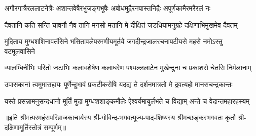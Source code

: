 \begin{AutoCols}[\maxColumns]
\fourlineindentedshloka
{अगौरगात्रैरललाटनेत्रैः}
{अशान्तवेषैरभुजङ्गभूषैः}
{अबोधमुद्रैरनपास्तनिद्रैः}
{अपूर्णकामैरमरैरलं नः}

\fourlineindentedshloka
{दैवतानि कति सन्ति चावनौ}
{नैव तानि मनसो मतानि मे}
{दीक्षितं जडधियामनुग्रहे}
{दक्षिणाभिमुखमेव दैवतम्}

\fourlineindentedshloka
{मुदिताय मुग्धशशिनावतंसिने}
{भसितावलेपरमणीयमूर्तये}
{जगदीन्द्रजालरचनापटीयसे}
{महसे नमोऽस्तु वटमूलवासिने}

\fourlineindentedshloka
{व्यालम्बिनीभिः परितो जटाभिः}
{कलावशेषेण कलाधरेण}
{पश्यल्ललाटेन मुखेन्दुना च}
{प्रकाशसे चेतसि निर्मलानाम्}

\fourlineindentedshloka
{उपासकानां त्वमुमासहायः}
{पूर्णेन्दुभावं प्रकटीकरोषि}
{यदद्य ते दर्शनमात्रतो मे}
{द्रवत्यहो मानसचन्द्रकान्तः}

\fourlineindentedshloka
{यस्ते प्रसन्नामनुसन्दधानो}
{मूर्तिं मुदा मुग्धशशाङ्कमौलेः}
{ऐश्वर्यमायुर्लभते च विद्याम्}
{अन्ते च वेदान्तमहारहस्यम्}
\end{AutoCols}

॥इति श्रीमत्परमहंसपरिव्राजकाचार्यस्य श्री-गोविन्द-भगवत्पूज्य-पाद-शिष्यस्य 
श्रीमच्छङ्करभगवतः कृतौ श्री-दक्षिणामूर्तिस्तोत्रं सम्पूर्णम्॥
